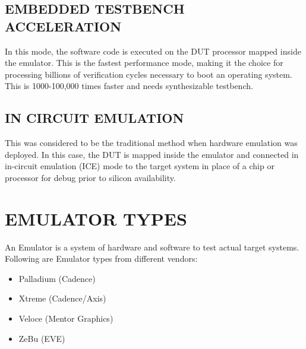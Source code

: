 \subsection{EMBEDDED TESTBENCH ACCELERATION}
In this mode, the software code is executed on the DUT processor mapped inside the emulator. This is the fastest performance mode, making it the choice for processing billions of verification cycles necessary to boot an operating system. This is 1000-100,000 times faster and needs synthesizable testbench.
\subsection{IN CIRCUIT EMULATION}
This was considered to be the traditional method when hardware emulation was deployed. In this case, the DUT is mapped inside the emulator and connected in in-circuit emulation (ICE) mode to the target system in place of a chip or processor for debug prior to silicon availability.

\section{EMULATOR TYPES}
An Emulator is a system of hardware and software to test actual target systems. Following are Emulator types from different vendors:
\begin{itemize}

\item Palladium (Cadence)
\item Xtreme (Cadence/Axis)
\item Veloce (Mentor Graphics)
\item ZeBu (EVE)
  
\end{itemize}

